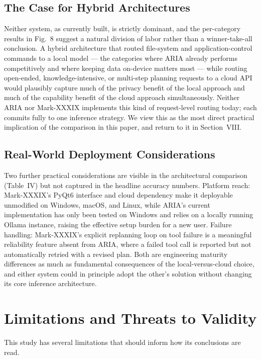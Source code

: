 \documentclass[conference]{IEEEtran}
\begin{document}
\subsection{The Case for Hybrid Architectures}

Neither system, as currently built, is strictly dominant, and the per-category results in Fig.~8 suggest a natural division of labor rather than a winner-take-all conclusion. A hybrid architecture that routed file-system and application-control commands to a local model --- the categories where ARIA already performs competitively and where keeping data on-device matters most --- while routing open-ended, knowledge-intensive, or multi-step planning requests to a cloud API would plausibly capture much of the privacy benefit of the local approach and much of the capability benefit of the cloud approach simultaneously. Neither ARIA nor Mark-XXXIX implements this kind of request-level routing today; each commits fully to one inference strategy. We view this as the most direct practical implication of the comparison in this paper, and return to it in Section~VIII.

\subsection{Real-World Deployment Considerations}

Two further practical considerations are visible in the architectural comparison (Table~IV) but not captured in the headline accuracy numbers. Platform reach: Mark-XXXIX's PyQt6 interface and cloud dependency make it deployable unmodified on Windows, macOS, and Linux, while ARIA's current implementation has only been tested on Windows and relies on a locally running Ollama instance, raising the effective setup burden for a new user. Failure handling: Mark-XXXIX's explicit replanning loop on tool failure is a meaningful reliability feature absent from ARIA, where a failed tool call is reported but not automatically retried with a revised plan. Both are engineering maturity differences as much as fundamental consequences of the local-versus-cloud choice, and either system could in principle adopt the other's solution without changing its core inference architecture.

\section{Limitations and Threats to Validity}

This study has several limitations that should inform how its conclusions are read.
\end{document}
